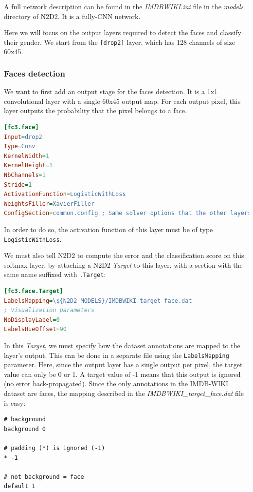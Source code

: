 \documentclass[a4paper,11pt,oneside]{article}
\begin{document}
A full network description can be found in the \emph{IMDBWIKI.ini} file in the
\emph{models} directory of N2D2. It is a fully-CNN network.

Here we will focus on the output layers required to detect the faces and
classify their gender. We start from the \lstinline![drop2]! layer, which has
128 channels of size 60x45.

\subsubsection{Faces detection}

We want to first add an output stage for the faces detection. It is a 1x1
convolutional layer with a single 60x45 output map. For each output pixel, this
layer outputs the probability that the pixel belongs to a face.

\begin{lstlisting}[language=ini]
[fc3.face]
Input=drop2
Type=Conv
KernelWidth=1
KernelHeight=1
NbChannels=1
Stride=1
ActivationFunction=LogisticWithLoss
WeightsFiller=XavierFiller
ConfigSection=common.config ; Same solver options that the other layers
\end{lstlisting}

In order to do so, the activation function of this layer must be of type
\lstinline!LogisticWithLoss!.

We must also tell N2D2 to compute the error and the classification score on this
softmax layer, by attaching a N2D2 \emph{Target} to this layer, with a
section with the same name suffixed with \lstinline!.Target!:

\begin{lstlisting}[language=ini]
[fc3.face.Target]
LabelsMapping=\${N2D2_MODELS}/IMDBWIKI_target_face.dat
; Visualization parameters
NoDisplayLabel=0
LabelsHueOffset=90
\end{lstlisting}

In this \emph{Target}, we must specify how the dataset annotations are mapped to
the layer's output. This can be done in a separate file using the
\lstinline!LabelsMapping! parameter. Here, since the output layer has a single
output per pixel, the target value can only be 0 or 1. A target value of -1
means that this output is ignored (no error back-propagated). Since the only
annotations in the IMDB-WIKI dataset are faces, the mapping described in the
\emph{IMDBWIKI\_target\_face.dat} file is easy:

\begin{lstlisting}
# background
background 0

# padding (*) is ignored (-1)
* -1

# not background = face
default 1
\end{lstlisting}
\end{document}
